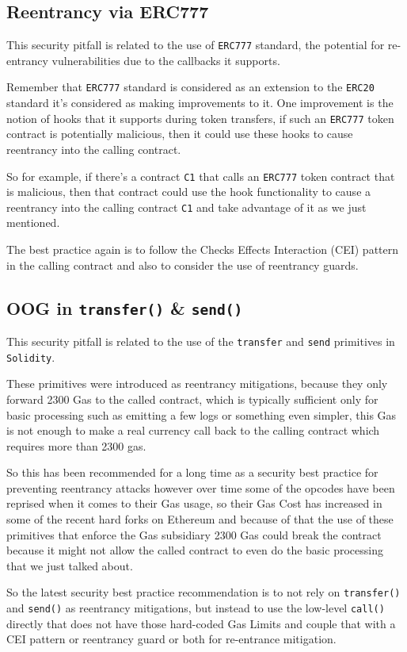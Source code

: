 \subsection{Reentrancy via ERC777}\label{reentrancy-via-erc777}

This security pitfall is related to the use of \texttt{ERC777} standard,
the potential for re-entrancy vulnerabilities due to the callbacks it
supports.

Remember that \texttt{ERC777} standard is considered as an extension to
the \texttt{ERC20} standard it's considered as making improvements to
it. One improvement is the notion of hooks that it supports during token
transfers, if such an \texttt{ERC777} token contract is potentially
malicious, then it could use these hooks to cause reentrancy into the
calling contract.

So for example, if there's a contract \texttt{C1} that calls an
\texttt{ERC777} token contract that is malicious, then that contract
could use the hook functionality to cause a reentrancy into the calling
contract \texttt{C1} and take advantage of it as we just mentioned.

The best practice again is to follow the Checks Effects Interaction
(CEI) pattern in the calling contract and also to consider the use of
reentrancy guards.

\subsection{\texorpdfstring{OOG in \texttt{transfer()} \&
\texttt{send()}}{OOG in transfer() \& send()}}\label{oog-in-transfer-send}

This security pitfall is related to the use of the \texttt{transfer} and
\texttt{send} primitives in \texttt{Solidity}.

These primitives were introduced as reentrancy mitigations, because they
only forward 2300 Gas to the called contract, which is typically
sufficient only for basic processing such as emitting a few logs or
something even simpler, this Gas is not enough to make a real currency
call back to the calling contract which requires more than 2300 gas.

So this has been recommended for a long time as a security best practice
for preventing reentrancy attacks however over time some of the opcodes
have been reprised when it comes to their Gas usage, so their Gas Cost
has increased in some of the recent hard forks on Ethereum and because
of that the use of these primitives that enforce the Gas subsidiary 2300
Gas could break the contract because it might not allow the called
contract to even do the basic processing that we just talked about.

So the latest security best practice recommendation is to not rely on
\texttt{transfer()} and \texttt{send()} as reentrancy mitigations, but
instead to use the low-level \texttt{call()} directly that does not have
those hard-coded Gas Limits and couple that with a CEI pattern or
reentrancy guard or both for re-entrance mitigation.
